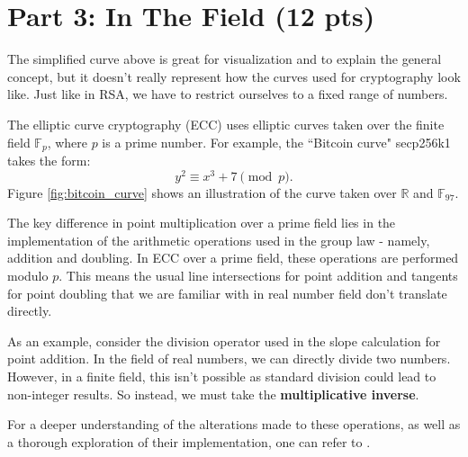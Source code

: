 \documentclass{article}
\begin{document}
\section*{Part 3: In The Field (12 pts)}
    The simplified curve above is great for visualization and to explain the general concept, but it doesn't really represent how the curves used for cryptography look like. Just like in RSA, we have to restrict ourselves to a fixed range of numbers.

    \vspace{3mm}
    The elliptic curve cryptography (ECC) uses elliptic curves taken over the finite field $\mathbb{F}_{p}$, where $p$ is a prime number. For example, the ``Bitcoin curve" secp256k1 takes the form: $$y^{2} \equiv x^{3} + 7 \pmod{p}.$$ Figure \ref*{fig:bitcoin_curve} shows an illustration of the curve taken over $\mathbb{R}$ and $\mathbb{F}_{97}$.

    \vspace{3mm}
    The key difference in point multiplication over a prime field lies in the implementation of the arithmetic operations used in the group law - namely, addition and doubling. In ECC over a prime field, these operations are performed modulo $p$. This means the usual line intersections for point addition and tangents for point doubling that we are familiar with in real number field don't translate directly.

    \vspace{3mm}
    As an example, consider the division operator used in the slope calculation for point addition. In the field of real numbers, we can directly divide two numbers. However, in a finite field, this isn't possible as standard division could lead to non-integer results. So instead, we must take the \textbf{multiplicative inverse}.

    \vspace{3mm}
    For a deeper understanding of the alterations made to these operations, as well as a thorough exploration of their implementation, one can refer to \cite{ec_blog}.
\end{document}

